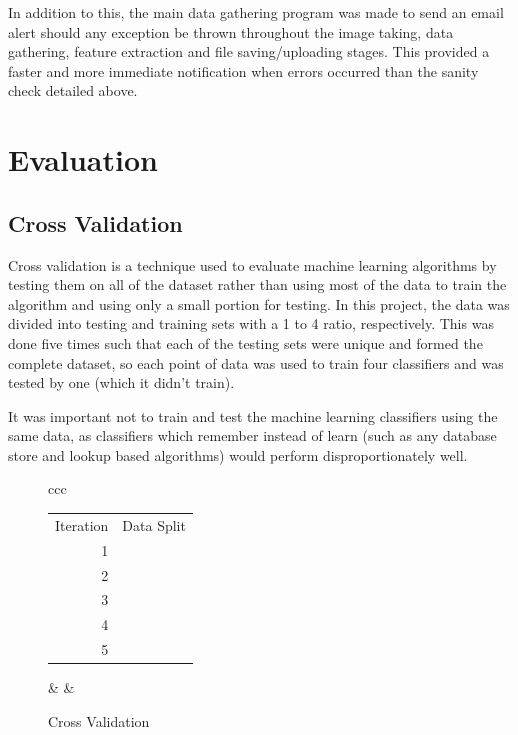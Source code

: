 \documentclass[a4paper,12pt,twoside]{report}
\begin{document}
In addition to this, the main data gathering program was made to send an email alert should any exception be thrown throughout the image taking, data gathering, feature extraction and file saving/uploading stages. This provided a faster and more immediate notification when errors occurred than the sanity check detailed above.


\chapter{Evaluation}

\section{Cross Validation}
Cross validation is a technique used to evaluate machine learning algorithms by testing them on all of the dataset rather than using most of the data to train the algorithm and using only a small portion for testing. In this project, the data was divided into testing and training sets with a 1 to 4 ratio, respectively. This was done five times such that each of the testing sets were unique and formed the complete dataset, so each point of data was used to train four classifiers and was tested by one (which it didn't train).

It was important not to train and test the machine learning classifiers using the same data, as classifiers which remember instead of learn (such as any database store and lookup based algorithms) would perform disproportionately well.

\begin{figure}[H]
  \centering
  \begin{tabular}{ccc}
    \begin{tabular}{rp{0.3cm}p{0.3cm}p{0.3cm}p{0.3cm}p{0.3cm}}
    \toprule
    Iteration & \multicolumn{5}{c}{Data Split} \\
    1 & \cellcolor{red!30} & \cellcolor{blue!50} & \cellcolor{blue!50} & \cellcolor{blue!50} & \cellcolor{blue!50} \\
    2 & \cellcolor{blue!50} & \cellcolor{red!30} & \cellcolor{blue!50} & \cellcolor{blue!50} & \cellcolor{blue!50} \\
    3 & \cellcolor{blue!50} & \cellcolor{blue!50} & \cellcolor{red!30} & \cellcolor{blue!50} & \cellcolor{blue!50} \\
    4 & \cellcolor{blue!50} & \cellcolor{blue!50} & \cellcolor{blue!50} & \cellcolor{red!30} & \cellcolor{blue!50} \\
    5 & \cellcolor{blue!50} & \cellcolor{blue!50} & \cellcolor{blue!50} & \cellcolor{blue!50} & \cellcolor{red!30} \\
    \bottomrule
  \end{tabular} &  & 
\end{tabular}
  \caption{Cross Validation}
  \label{xval}
\end{figure}
\end{document}
